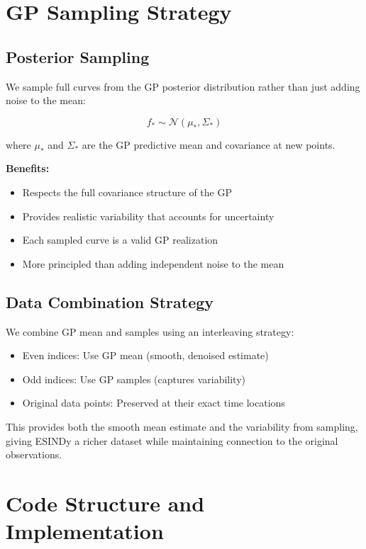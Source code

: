 \documentclass[11pt]{article}
\begin{document}
\section{GP Sampling Strategy}

\subsection{Posterior Sampling}

We sample full curves from the GP posterior distribution rather than just adding noise to the mean:

\begin{equation}
f_* \sim \mathcal{N}(\mu_*, \Sigma_*)
\end{equation}

where $\mu_*$ and $\Sigma_*$ are the GP predictive mean and covariance at new points.

\textbf{Benefits:}
\begin{itemize}
    \item Respects the full covariance structure of the GP
    \item Provides realistic variability that accounts for uncertainty
    \item Each sampled curve is a valid GP realization
    \item More principled than adding independent noise to the mean
\end{itemize}

\subsection{Data Combination Strategy}

We combine GP mean and samples using an interleaving strategy:
\begin{itemize}
    \item Even indices: Use GP mean (smooth, denoised estimate)
    \item Odd indices: Use GP samples (captures variability)
    \item Original data points: Preserved at their exact time locations
\end{itemize}

This provides both the smooth mean estimate and the variability from sampling, giving ESINDy a richer dataset while maintaining connection to the original observations.

\section{Code Structure and Implementation}
\end{document}
